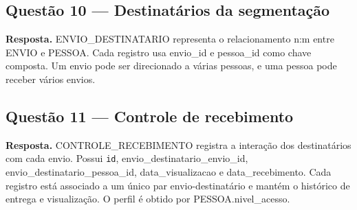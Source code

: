 \subsection{Questão 10 — Destinatários da segmentação}
\textbf{Resposta.} ENVIO\_DESTINATARIO representa o relacionamento n:m entre ENVIO e PESSOA.
Cada registro usa envio\_id e pessoa\_id como chave composta. Um envio pode ser direcionado
a várias pessoas, e uma pessoa pode receber vários envios.

\subsection{Questão 11 — Controle de recebimento}
\textbf{Resposta.} CONTROLE\_RECEBIMENTO registra a interação dos destinatários com cada envio.
Possui \texttt{id}, envio\_destinatario\_envio\_id, envio\_destinatario\_pessoa\_id,
data\_visualizacao e data\_recebimento. Cada registro está associado a um único par envio-destinatário
e mantém o histórico de entrega e visualização. O perfil é obtido por PESSOA.nivel\_acesso.
